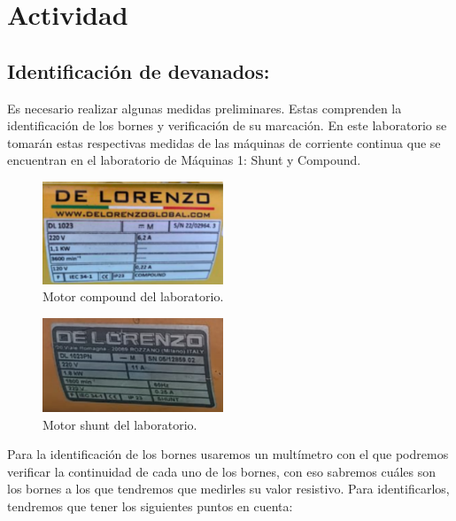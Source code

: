 \section{Actividad}

\subsection*{Identificación de devanados:}

Es necesario realizar algunas medidas preliminares. Estas comprenden la identificación de los bornes y verificación de su marcación. En este laboratorio se tomarán estas respectivas medidas de las máquinas de corriente continua que se encuentran en el laboratorio de Máquinas 1: Shunt y Compound.
\begin{figure}[ht!]
    \centering
    \includegraphics[width=0.48\textwidth]{fot/Prac_6_compound.png}
    \caption{Motor compound del laboratorio.}
    \label{fig:compound}
\end{figure}
\begin{figure}[ht!]
    \centering
    \includegraphics[width=0.48\textwidth]{fot/Prac_6_shunt.png}
    \caption{Motor shunt del laboratorio.}
    \label{fig:shunt}
\end{figure}
Para la identificación de los bornes usaremos un multímetro con el que podremos verificar la continuidad de cada uno de los bornes, con eso sabremos cuáles son los bornes a los que tendremos que medirles su valor resistivo. Para identificarlos, tendremos que tener los siguientes puntos en cuenta:

